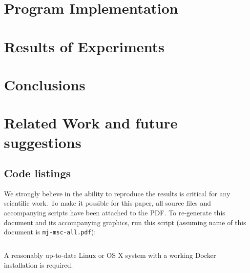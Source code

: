 \documentclass[a4paper]{article}
\begin{document}
\section{Program Implementation}

\section{Results of Experiments}

\section{Conclusions}
\label{sec:conclusions}

\section{Related Work and future suggestions}
\label{sec:related_work}

\printbibliography

\begin{appendices}

\section{Code listings}

We strongly believe in the ability to reproduce the results is critical for any
    scientific work. To make it possible for this paper, all source files and
    accompanying scripts have been attached to the PDF. To re-generate this
    document and its accompanying graphics, run this script (assuming name of
    this document is {\tt mj-msc-all.pdf}):

\inputminted[fontsize=\small]{bash}{extract-and-generate}

A reasonably up-to-date Linux or OS X system with a working Docker installation
is required.

\end{appendices}
\end{document}
